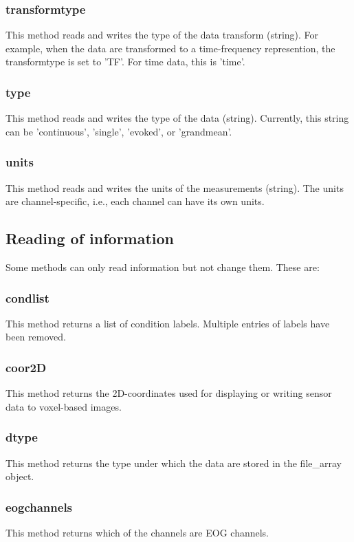 \subsubsection{transformtype}
This method reads and writes the type of the data transform
(string). For example, when the data are transformed to a
time-frequency represention, the transformtype is set to 'TF'. For
time data, this is 'time'.

\subsubsection{type}
This method reads and writes the type of the data (string). Currently,
this string can be 'continuous', 'single', 'evoked', or 'grandmean'.

\subsubsection{units}
This method reads and writes the units of the measurements
(string). The units are channel-specific, i.e., each channel can have
its own units.


\subsection{Reading of information}
Some methods can only read information but not change them. These are:

\subsubsection{condlist}
This method returns a list of condition labels. Multiple entries of
labels have been removed.

\subsubsection{coor2D}
This method returns the 2D-coordinates used for displaying or writing
sensor data to voxel-based images.

\subsubsection{dtype}
This method returns the type under which the data are stored in the
file\_array object. 

\subsubsection{eogchannels}
This method returns which of the channels are EOG channels.

